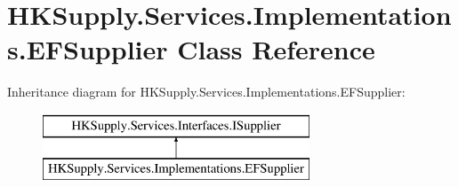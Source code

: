 \hypertarget{class_h_k_supply_1_1_services_1_1_implementations_1_1_e_f_supplier}{}\section{H\+K\+Supply.\+Services.\+Implementations.\+E\+F\+Supplier Class Reference}
\label{class_h_k_supply_1_1_services_1_1_implementations_1_1_e_f_supplier}
Inheritance diagram for H\+K\+Supply.\+Services.\+Implementations.\+E\+F\+Supplier\+:\begin{figure}[H]
\begin{center}
\leavevmode
\includegraphics[height=2.000000cm]{class_h_k_supply_1_1_services_1_1_implementations_1_1_e_f_supplier}
\end{center}
\end{figure}
